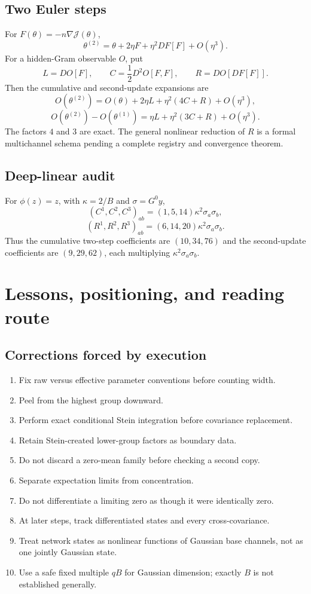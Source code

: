 \documentclass[11pt,oneside]{report}
\begin{document}
\section{Two Euler steps}

For $F(\theta)=-n\nabla\mathcal J(\theta)$,
\[
\theta^{(2)}
=\theta+2\eta F+\eta^2DF[F]+O(\eta^3).
\]
For a hidden-Gram observable $O$, put
\[
L=DO[F],\qquad
C=\frac12D^2O[F,F],\qquad
R=DO[DF[F]].
\]
Then the cumulative and second-update expansions are
\[
O(\theta^{(2)})
=O(\theta)+2\eta L+\eta^2(4C+R)+O(\eta^3),
\]
\[
O(\theta^{(2)})-O(\theta^{(1)})
=\eta L+\eta^2(3C+R)+O(\eta^3).
\]
The factors $4$ and $3$ are exact.  The general nonlinear reduction of $R$
is a formal multichannel schema pending a complete registry and convergence
theorem.

\section{Deep-linear audit}

For $\phi(z)=z$, with $\kappa=2/B$ and $\sigma=G^0y$,
\[
(C^1,C^2,C^3)_{ab}
=(1,5,14)\kappa^2\sigma_a\sigma_b,
\]
\[
(R^1,R^2,R^3)_{ab}
=(6,14,20)\kappa^2\sigma_a\sigma_b.
\]
Thus the cumulative two-step coefficients are $(10,34,76)$ and the
second-update coefficients are $(9,29,62)$, each multiplying
$\kappa^2\sigma_a\sigma_b$.

\chapter{Lessons, positioning, and reading route}

\section{Corrections forced by execution}

\begin{enumerate}
\item Fix raw versus effective parameter conventions before counting width.
\item Peel from the highest group downward.
\item Perform exact conditional Stein integration before covariance
replacement.
\item Retain Stein-created lower-group factors as boundary data.
\item Do not discard a zero-mean family before checking a second copy.
\item Separate expectation limits from concentration.
\item Do not differentiate a limiting zero as though it were identically zero.
\item At later steps, track differentiated states and every cross-covariance.
\item Treat network states as nonlinear functions of Gaussian base channels,
not as one jointly Gaussian state.
\item Use a safe fixed multiple $qB$ for Gaussian dimension; exactly $B$ is
not established generally.
\end{enumerate}
\end{document}
